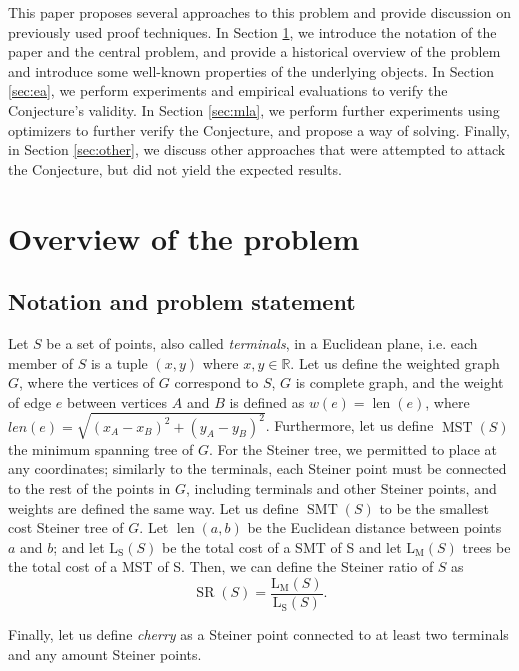 \documentclass{mpaper}
\begin{document}
This paper proposes several approaches to this problem and provide discussion on previously used proof techniques. In Section \ref{sec:bg}, we introduce the notation of the paper and the central problem, and provide a historical overview of the problem and introduce some well-known properties of the underlying objects.
In Section \ref{sec:ea}, we perform experiments and empirical evaluations to verify the Conjecture's validity. In Section \ref{sec:mla}, we perform further experiments using optimizers to further verify the Conjecture, and propose a way of solving. Finally, in Section \ref{sec:other}, we discuss other approaches that were attempted to attack the Conjecture, but did not yield the expected results.


\section{Overview of the problem}\label{sec:bg}
\subsection{Notation and problem statement} %

Let $S$ be a set of points, also called \emph{terminals}, in a Euclidean plane, i.e. each member of $S$ is a tuple $(x,y)$ where $x,y\in\mathbb{R}$. Let us define the weighted graph $G$, where the vertices of $G$ correspond to $S$, $G$ is complete graph, and the weight of edge $e$ between vertices $A$ and $B$ is defined as $w(e)=\operatorname{len}(e)$, where $len(e) = \sqrt{(x_A-x_B)^2+(y_A-y_B)^2}$. Furthermore, let us define $\operatorname{MST}(S)$ the minimum spanning tree of $G$. For the Steiner tree, we permitted to place at any coordinates; similarly to the terminals, each Steiner point must be connected to the rest of the points in $G$, including terminals and other Steiner points, and weights are defined the same way. Let us define $\operatorname{SMT}(S)$ to be the smallest cost Steiner tree of $G$. 
Let $\operatorname{len}(a,b)$ be the Euclidean distance between points $a$ and $b$; and let $\operatorname{L_S}(S)$ be the total cost of a SMT of S and let $\operatorname{L_M}(S)$ trees be the total cost of a MST of S.  Then, we can define the Steiner ratio of $S$ as
$$\operatorname{SR}(S)=\frac{\operatorname{L_M}(S)}{\operatorname{L_S}(S)}.$$


Finally, let us define \emph{cherry} as a Steiner point connected to at least two terminals and any amount Steiner points.
\end{document}
